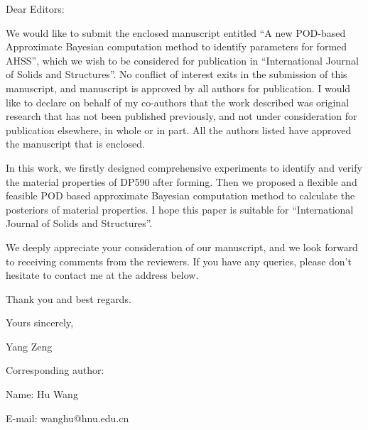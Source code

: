 \documentclass[review]{elsarticle}
\begin{document}
\noindent Dear Editors:

We would like to submit the enclosed manuscript entitled ``A new POD-based Approximate Bayesian computation method to identify parameters for formed AHSS'', which we wish to be considered for publication in ``International Journal of Solids and Structures''. No conflict of interest exits in the submission of this manuscript, and manuscript is approved by all authors for publication. I would like to declare on behalf of my co-authors that the work described was original research that has not been published previously, and not under consideration for publication elsewhere, in whole or in part. All the authors listed have approved the manuscript that is enclosed.

In this work, we firstly designed comprehensive experiments to identify and verify the material properties of DP590 after forming. Then we proposed a flexible and feasible POD based approximate Bayesian computation method to calculate the posteriors of material properties. I hope this paper is suitable for  ``International Journal of Solids and Structures''.

We deeply appreciate your consideration of our manuscript, and we look forward to receiving comments from the reviewers. If you have any queries, please don’t hesitate to contact me at the address below.

Thank you and best regards.

Yours sincerely,

Yang Zeng

Corresponding author:

Name: Hu Wang

E-mail: wanghu@hnu.edu.cn
\end{document}
